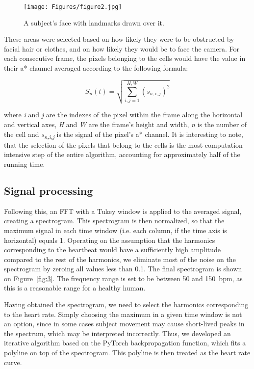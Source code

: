 \begin{figure}[htbp]
    \centering
    \texttt{[image: Figures/figure2.jpg]}
    \caption{A subject’s face with landmarks drawn over it.}
    \label{fig:2}
\end{figure}

These areas were selected based on how likely they were to be obstructed by facial hair or clothes, and on how likely they would be to face the camera. For each consecutive frame, the pixels belonging to the cells would have the value in their a* channel averaged according to the following formula:


\begin{equation}
    S_{n}(t)=\sqrt{\sum_{i,j=1}^{H,W}(s_{n,i,j})^{2}}
    \label{eq:1}
\end{equation}

where \emph{i} and \emph{j} are the indexes of the pixel within the frame along the horizontal and vertical axes, \emph{H} and \emph{W} are the frame’s height and width, \emph{n} is the number of the cell and \emph{s\textsubscript{n,i,j}} is the signal of the pixel’s a* channel. It is interesting to note, that the selection of the pixels that belong to the cells is the most computation-intensive step of the entire algorithm, accounting for approximately half of the running time.

\subsection{Signal processing}\label{meth_signal_processing}

Following this, an FFT with a Tukey window is applied to the averaged signal, creating a spectrogram. This spectrogram is then normalized, so that the maximum signal in each time window (i.e. each column, if the time axis is horizontal) equals 1. Operating on the assumption that the harmonics corresponding to the heartbeat would have a sufficiently high amplitude compared to the rest of the harmonics, we eliminate most of the noise on the spectrogram by zeroing all values less than 0.1. The final spectrogram is shown on Figure~\ref{fig:3}. The frequency range is set to be between 50 and 150~bpm, as this is a reasonable range for a healthy human.

Having obtained the spectrogram, we need to select the harmonics corresponding to the heart rate. Simply choosing the maximum in a given time window is not an option, since in some cases subject movement may cause short-lived peaks in the spectrum, which may be interpreted incorrectly. Thus, we developed an iterative algorithm based on the PyTorch backpropagation function, which fits a polyline on top of the spectrogram. This polyline is then treated as the heart rate curve.

